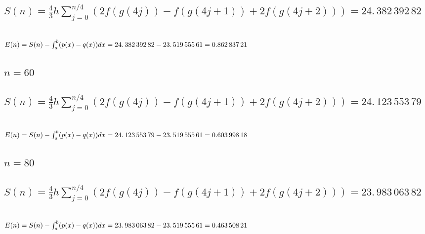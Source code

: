 \documentclass{article}
\begin{document}
\subsection{$S(n)=\frac{4}{3}h\sum%
\limits_{j=0}^{n/4}(2f(g(4j))-f(g(4j+1))+2f(g(4j+2)))=\allowbreak
24.\,\allowbreak 382\,392\,82$}

\subsection{$E(n)=S(n)-\protect\int_{a}^{b}(p(x)-q(x))dx\allowbreak
=24.\,\allowbreak 382\,392\,82-\allowbreak 23.\,\allowbreak
519\,555\,61=\allowbreak 0.862\,837\,21$ }

\subsection{$n=60$}

\subsection{$S(n)=\frac{4}{3}h\sum%
\limits_{j=0}^{n/4}(2f(g(4j))-f(g(4j+1))+2f(g(4j+2)))=\allowbreak
24.\,\allowbreak 123\,553\,79$}

\subsection{$E(n)=S(n)-\protect\int_{a}^{b}(p(x)-q(x))dx\allowbreak
\allowbreak =24.\,\allowbreak 123\,553\,79-\allowbreak 23.\,\allowbreak
519\,555\,61=\allowbreak 0.603\,998\,18$}

\bigskip

\subsection{$n=80$}

\subsection{$S(n)=\frac{4}{3}h\sum%
\limits_{j=0}^{n/4}(2f(g(4j))-f(g(4j+1))+2f(g(4j+2)))=\allowbreak
23.\,\allowbreak 983\,063\,82$}

\subsection{\protect\bigskip $E(n)=S(n)-\protect\int_{a}^{b}(p(x)-q(x))dx%
\allowbreak \allowbreak =\allowbreak 23.\,\allowbreak
983\,063\,82-23.\,\allowbreak 519\,555\,61=\allowbreak 0.463\,508\,21$}
\end{document}
